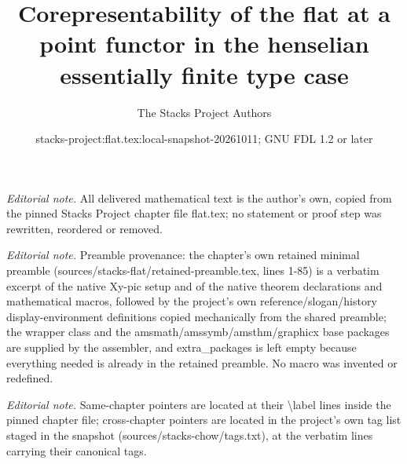 \documentclass[10pt,a4paper]{amsart}
\title{Corepresentability of the flat at a point functor in the henselian essentially finite type case}
\author{The Stacks Project Authors}
\date{stacks-project:flat.tex:local-snapshot-20261011; GNU FDL 1.2 or later}
\theoremstyle{plain}
\theoremstyle{definition}
\theoremstyle{remark}
\numberwithin{equation}{subsection}
\begin{document}
\maketitle
\noindent\textit{Editorial note.} All delivered mathematical text is the author's own, copied from the pinned Stacks Project chapter file flat.tex; no statement or proof step was rewritten, reordered or removed.\par\medskip
\noindent\textit{Editorial note.} Preamble provenance: the chapter's own retained minimal preamble (sources/stacks-flat/retained-preamble.tex, lines 1-85) is a verbatim excerpt of the native Xy-pic setup and of the native theorem declarations and mathematical macros, followed by the project's own reference/slogan/history display-environment definitions copied mechanically from the shared preamble; the wrapper class and the amsmath/amssymb/amsthm/graphicx base packages are supplied by the assembler, and extra\_packages is left empty because everything needed is already in the retained preamble. No macro was invented or redefined.\par\medskip
\noindent\textit{Editorial note.} Same-chapter pointers are located at their \textbackslash{}label lines inside the pinned chapter file; cross-chapter pointers are located in the project's own tag list staged in the snapshot (sources/stacks-chow/tags.txt), at the verbatim lines carrying their canonical tags.\par\medskip
\end{document}
